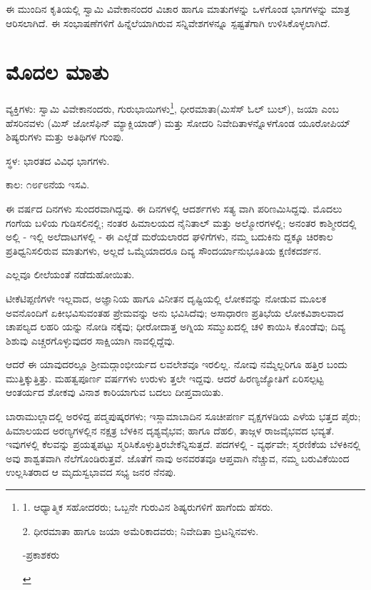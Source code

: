 
ಈ ಮುಂದಿನ ಕೃತಿಯಲ್ಲಿ ಸ್ವಾಮಿ ವಿವೇಕಾನಂದರ ವಿಚಾರ ಹಾಗೂ ಮಾತುಗಳನ್ನು ಒಳಗೊಂಡ ಭಾಗಗಳನ್ನು ಮಾತ್ರ ಆರಿಸಲಾಗಿದೆ. ಈ ಸಂಭಾಷಣೆಗಳಿಗೆ ಹಿನ್ನೆಲೆಯಾಗಿರುವ ಸನ್ನಿವೇಶಗಳನ್ನೂ ಸ್ಪಷ್ಟತೆಗಾಗಿ ಉಳಿಸಿಕೊಳ್ಳಲಾಗಿದೆ.

\chapter{ಮೊದಲ ಮಾತು}

ವ್ಯಕ್ತಿಗಳು: ಸ್ವಾಮಿ ವಿವೇಕಾನಂದರು, ಗುರುಭಾಯಿಗಳು\footnote{1. ಆಧ್ಯಾತ್ಮಿಕ ಸಹೋದರರು; ಒಬ್ಬನೇ ಗುರುವಿನ ಶಿಷ್ಯರುಗಳಿಗೆ ಹಾಗೆಂದು ಹೆಸರು.

2. ಧೀರಮಾತಾ ಹಾಗೂ ಜಯಾ ಅಮೆರಿಕಾದವರು; ನಿವೇದಿತಾ ಬ್ರಿಟನ್ನಿನವಳು.

\begin{flushright}
-ಪ್ರಕಾಶಕರು
\end{flushright}}, ಧೀರಮಾತಾ(ಮಿಸೆಸ್ ಓಲ್ ಬುಲ್), ಜಯಾ ಎಂಬ ಹೆಸರಿನವಳು (ಮಿಸ್ ಜೋಸೆಫಿನ್ ಮ್ಯಾಕ್ಲಿಯಾಡ್) ಮತ್ತು ಸೋದರಿ ನಿವೇದಿತಾಳನ್ನೊಳಗೊಂಡ ಯೂರೋಪಿಯ್​ ಶಿಷ್ಯರುಗಳು ಮತ್ತು ಅತಿಥಿಗಳ ಗುಂಪು.

ಸ್ಥಳ: ಭಾರತದ ವಿವಿಧ ಭಾಗಗಳು.

ಕಾಲ: ೧೮೯೮ನೆಯ ಇಸವಿ.

ಈ ವರ್ಷದ ದಿನಗಳು ಸುಂದರವಾಗಿದ್ದವು. ಈ ದಿನಗಳಲ್ಲಿ ಆದರ್ಶಗಳು ಸತ್ಯ ವಾಗಿ ಪರಿಣಮಿಸಿದ್ದವು. ಮೊದಲು ಗಂಗೆಯ ಬಳಿಯ ಗುಡಿಸಲಿನಲ್ಲಿ; ನಂತರ ಹಿಮಾಲಯದ ನೈನಿತಾಲ್ ಮತ್ತು ಅಲ್ಮೋರಗಳಲ್ಲಿ; ಅನಂತರ ಕಾಶ್ಮೀರದಲ್ಲಿ ಅಲ್ಲಿ - ಇಲ್ಲಿ ಅಲೆದಾಟಗಳಲ್ಲಿ - ಈ ಎಲ್ಲೆಡೆ ಮರೆಯಲಾರದ ಘಳಿಗೆಗಳು, ನಮ್ಮ ಬದುಕಿನು ದ್ದಕ್ಕೂ ಚಿರಕಾಲ ಪ್ರತಿಧ್ವನಿಸಲಿರುವ ಮಾತುಗಳು, ಅಲ್ಲದೆ ಒಮ್ಮೆಯಾದರೂ ದಿವ್ಯ ಸೌಂದರ್ಯಾನುಭೂತಿಯ ಕ್ಷಣಿಕದರ್ಶನ.

ಎಲ್ಲವೂ ಲೀಲೆಯಂತೆ ನಡೆದುಹೋಯಿತು.

ಟೀಕೆಟಿಪ್ಪಣಿಗಳೇ ಇಲ್ಲವಾದ, ಅಜ್ಞಾನಿಯ ಹಾಗೂ ವಿನೀತನ ದೃಷ್ಟಿಯಲ್ಲಿ ಲೋಕವನ್ನು ನೋಡುವ ಮೂಲಕ ಅವನೊಂದಿಗೆ ಏಕೀಭವಿಸುವಂತಹ ಪ್ರೇಮವನ್ನು ಅನು ಭವಿಸಿದೆವು; ಅಸಾಧಾರಣ ಪ್ರತಿಭೆಯ ಲೋಕವಿಶಾಲವಾದ ಚಾಪಲ್ಯದ ಲಹರಿ ಯನ್ನು ನೋಡಿ ನಕ್ಕೆವು; ಧೀರೋದಾತ್ತ ಅಗ್ನಿಯ ಸಮ್ಮುಖದಲ್ಲಿ ಚಳಿ ಕಾಯಿಸಿ ಕೊಂಡೆವು; ದಿವ್ಯ ಶಿಶುವು ಎಚ್ಚರಗೊಳ್ಳುವುದರ ಸಾಕ್ಷಿಯಾಗಿ ನಾವಲ್ಲಿದ್ದೆವು.

ಆದರೆ ಈ ಯಾವುದರಲ್ಲೂ ಶ‍್ರೀಮದ್ಗಾಂಭೀರ್ಯದ ಲವಲೇಶವೂ ಇರಲಿಲ್ಲ. ನೋವು ನಮ್ಮೆಲ್ಲರಿಗೂ ಹತ್ತಿರ ಬಂದು ಮುತ್ತಿಕ್ಕುತ್ತಿತ್ತು. ಮಹತ್ವಪೂರ್ಣ ವರ್ಷಗಳು ಉರುಳು ತ್ತಲೇ ಇದ್ದವು. ಆದರೆ ಹಿರಣ್ಯಜ್ಯೋತಿಗೆ ಏರಿಸಲ್ಪಟ್ಟ ಆಂತರ್ಯದ ಶೋಕವು ವಿನಾಶ ಕಾರಿಯಾಗುವ ಬದಲು ದೀಪ್ತವಾಯಿತು.

ಬಾರಾಮುಲ್ಲಾದಲ್ಲಿ ಅರಳಿದ್ದ ಪದ್ಮಪುಷ್ಕರಗಳು; ಇಸ್ಲಾಮಾಬಾದಿನ ಸೂಚೀಪರ್ಣ ವೃಕ್ಷಗಳಡಿಯ ಎಳೆಯ ಭತ್ತದ ಪೈರು; ಹಿಮಾಲಯದ ಅರಣ್ಯಗಳಲ್ಲಿನ ನಕ್ಷತ್ರ ಬೆಳಕಿನ ದೃಶ್ಯವೈಭವ; ಹಾಗೂ ದೆಹಲಿ, ತಾಜ್ಗಳ ರಾಜವೈಭವದ ಭವ್ಯತೆ. ಇವುಗಳಲ್ಲಿ ಕೆಲವನ್ನು ಪ್ರಯತ್ನಪಟ್ಟು ಸ್ಮರಿಸಿಕೊಳ್ಳುತ್ತಿರಬೇಕೆನ್ನಿಸುತ್ತದೆ. ಪದಗಳಲ್ಲಿ - ವ್ಯರ್ಥವೇ; ಸ್ಮರಣಿಕೆಯ ಬೆಳಕಿನಲ್ಲಿ ಅವು ಶಾಶ್ವತವಾಗಿ ನೆಲೆಗೊಂಡಿರುತ್ತವೆ. ಜೊತೆಗೆ ನಾವು ಅನವರತವೂ ಆಪ್ತವಾಗಿ ನೆಚ್ಚುವ, ನಮ್ಮ ಬರುವಿಕೆಯಿಂದ ಉಲ್ಲಸಿತರಾದ ಆ ಮೃದುಸ್ವಭಾವದ ಸಭ್ಯ ಜನರ ನೆನಪು.

